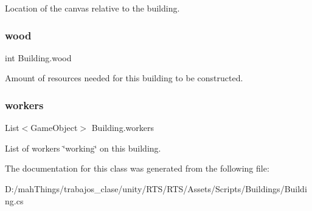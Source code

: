 Location of the canvas relative to the building. 

\mbox{\label{class_building_ab7873f236278124c6acdcee2bcc4b54b}} 
\subsubsection{\texorpdfstring{wood}{wood}}
{\footnotesize\ttfamily int Building.\+wood\hspace{0.3cm}{\ttfamily [protected]}}



Amount of resources needed for this building to be constructed. 

\mbox{\label{class_building_a0058fcade6af241bbb53527ca3b030af}} 
\subsubsection{\texorpdfstring{workers}{workers}}
{\footnotesize\ttfamily List$<$Game\+Object$>$ Building.\+workers\hspace{0.3cm}{\ttfamily [protected]}}



List of workers \char`\"{}working\char`\"{} on this building. 



The documentation for this class was generated from the following file\+:\begin{DoxyCompactItemize}
\item 
D\+:/mah\+Things/trabajos\+\_\+clase/unity/\+R\+T\+S/\+R\+T\+S/\+Assets/\+Scripts/\+Buildings/Building.\+cs\end{DoxyCompactItemize}
